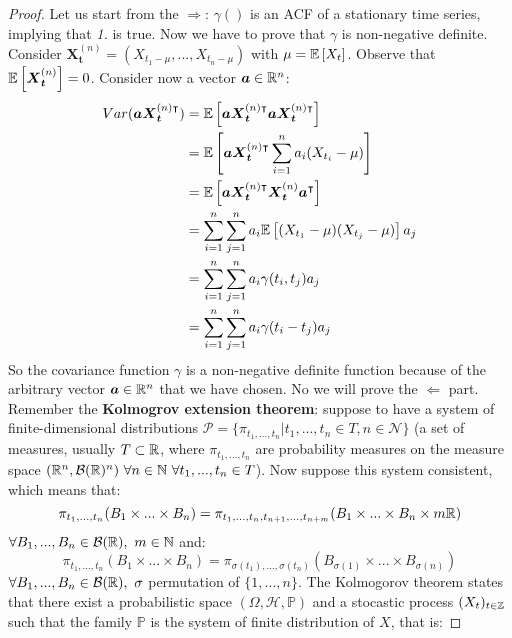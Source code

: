 \begin{proof}
    Let us start from the $\Longrightarrow$: $\gamma()$ is an ACF of a stationary time series, implying that \textit{1.} is true. Now we have to prove that $\gamma$ is non-negative definite.
    Consider $\boldsymbol{X}_{\boldsymbol{t}}^{(n)}=(X_{t_1-\mu},...,X_{t_n-\mu})$ with $\mu=\mathbb{E}\left[X_t\right]$. Observe that $\mathbb{E}\left[\boldsymbol{X}_{\boldsymbol{t}}^{(n)}\right]=0$. Consider now a vector $\boldsymbol{a}\in\mathbb{R}^n$:
    \begin{equation*}
        \begin{split}
            Var(\boldsymbol{a}\boldsymbol{X}_{\boldsymbol{t}}^{(n)\intercal})&=\mathbb{E}\left[\boldsymbol{a}\boldsymbol{X}_{\boldsymbol{t}}^{(n)\intercal}\boldsymbol{a}\boldsymbol{X}_{\boldsymbol{t}}^{(n)\intercal}\right]\\
            &=\mathbb{E}\left[\boldsymbol{a}\boldsymbol{X}_{\boldsymbol{t}}^{(n)\intercal}\sum_{i=1}^na_i(X_{t_i}-\mu)\right]\\
            &=\mathbb{E}\left[\boldsymbol{a}\boldsymbol{X}_{\boldsymbol{t}}^{(n)\intercal}\boldsymbol{X}_{\boldsymbol{t}}^{(n)}\boldsymbol{a}^\intercal\right]\\
            &=\sum_{i=1}^n\sum_{j=1}^na_i\mathbb{E}\left[(X_{t_1}-\mu)(X_{t_j}-\mu)\right]a_j\\
            &=\sum_{i=1}^n\sum_{j=1}^na_i\gamma(t_i,t_j)a_j\\
            &=\sum_{i=1}^n\sum_{j=1}^na_i\gamma(t_i-t_j)a_j\\
        \end{split}
    \end{equation*}
    So the covariance function $\gamma$ is a non-negative definite function because of the arbitrary vector $\boldsymbol{a}\in\mathbb{R}^n$ that we have chosen.
    No we will prove the $\Longleftarrow$ part. Remember the \textbf{Kolmogrov extension theorem}: suppose to have a system of finite-dimensional distributions $\mathcal{P}=\{\pi_{t_1,...,t_n}|t_1,...,t_n\in T, n\in\mathcal{N}\}$ (a set of measures, usually $T\subset\mathbb{R}$, where $\pi_{t_1,...,t_n}$ are probability measures on the measure space $(\mathbb{R}^n,\mathcal{B}(\mathbb{R})^n)\ \forall n\in\mathbb{N}\ \forall t_1,...,t_n\in T$). Now suppose this system consistent, which means that:
    \[
        \pi_{t_1,...,t_n}(B_1\times...\times B_n)=\pi_{t_1,...,t_n,t_{n+1},...,t_{n+m}}(B_1\times...\times B_n\times m\mathbb{R})  
    \]
    $\forall B_1,...,B_n\in\mathcal{B}(\mathbb{R}),\ m\in\mathbb{N}$ and:
    \[
        \pi_{t_1,...,t_n}(B_1\times...\times B_n)=\pi_{\sigma(t_1),...,\sigma{(t_n)}}(B_{\sigma(1)}\times...\times B_{\sigma{(n)}})
    \]
    $\forall B_1,...,B_n\in\mathcal{B}(\R),\ \sigma$ permutation of $\{1,...,n\}$. The Kolmogorov theorem states that there exist a probabilistic space $(\Omega,\mathcal{H},\mathbb{P})$ and a stocastic process $(X_t)_{t\in\mathbb{Z}}$ such that the family $\mathbb{P}$ is the system of finite distribution of $X$, that is:

\end{proof}
